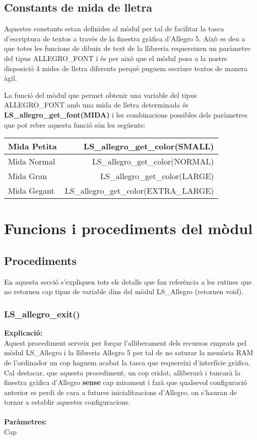 \documentclass[11pt]{article}
\begin{document}
\subsection{Constants de mida de lletra}
Aquestes constants estan definides al mòdul per tal de facilitar la tasca d'escriptura de textos a través de la finestra gràfica d'Allegro 5. Això es deu a que totes les funcions de dibuix de text de la llibreria requereixen un paràmetre del tipus ALLEGRO\_FONT i és per això que el mòdul posa a la nostre disposició 4 mides de lletra diferents perquè puguem escriure textos de manera àgil.
 
\pagebreak 
\noindent La funció del mòdul que permet obtenir una variable del tipus ALLEGRO\_FONT amb una mida de lletra determinada és \textbf{LS\_allegro\_get\_font(MIDA)} i les combinacions possibles dels paràmetres que pot rebre aquesta funció són les següents:

\begin{center}
	\begin{tabular}{|l|r|}
		\hline
		Mida Petita & LS\_allegro\_get\_color(SMALL) \\
		\hline	
		Mida Normal & LS\_allegro\_get\_color(NORMAL) \\
		\hline	
		Mida Gran & LS\_allegro\_get\_color(LARGE) \\
		\hline
		Mida Gegant & LS\_allegro\_get\_color(EXTRA\_LARGE) \\
		\hline
	\end{tabular}
\end{center}

\section{Funcions i procediments del mòdul}

\subsection{Procediments}
En aquesta secció s'expliquen tots els detalls que fan referència a les rutines que no retornen cap tipus de variable dins del mòdul LS\_Allegro (retornen void).

\subsubsection{LS\_allegro\_exit()}

\textbf{Explicació:}\\
Aquest procediment serveix per forçar l'alliberament dels recursos emprats pel mòdul LS\_Allegro i la llibreria Allegro 5 per tal de no saturar la memòria RAM de l'ordinador un cop haguem acabat la tasca que requereixi d'interfície gràfica. Cal destacar, que aquesta procediment, un cop cridat, alliberarà i tancarà la finestra gràfica d'Allegro \textbf{sense} cap mirament i farà que qualsevol configuració anterior es perdi de cara a futures inicialitzacions d'Allegro, on s'hauran de tornar a establir aquestes configuracions.\\\\
\noindent \textbf{Paràmetres:}\\ Cap
\end{document}
